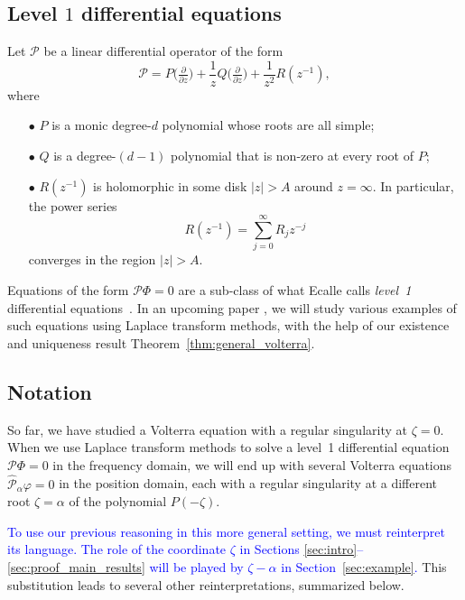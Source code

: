 \documentclass[review]{siamart220329}
\begin{document}
\subsection{Level $1$ differential equations}\label{sec:level 1 ODE}
Let $\mathcal{P}$ be a linear differential operator of the form
\[ \mathcal{P} = P\big(\tfrac{\partial}{\partial z}\big) + \frac{1}{z} Q\big(\tfrac{\partial}{\partial z}\big) + \frac{1}{z^2} R(z^{-1}), \]
where
\begin{enumerate}
\item[$\bullet$] $P$ is a monic degree-$d$ polynomial whose roots are all simple; 
\item[$\bullet$] $Q$ is a degree-$(d-1)$ polynomial that is non-zero at every root of $P$;
\item[$\bullet$] $R(z^{-1})$ is holomorphic in some disk $|z| > A$ around $z = \infty$. In particular, the power series
\[ R(z^{-1}) = \sum_{j=0}^\infty R_j z^{-j} \]
converges in the region $|z| > A$.
\end{enumerate}
Equations of the form $\mathcal{P}\Phi = 0$ are a sub-class of what Ecalle calls {\em level~1} differential equations~\cite[Section~2.1]{EcalleIII}\cite[Section~5.2.2.1]{diverg-resurg-iii}. In an upcoming paper \cite{borel_reg}, we will study various examples of such equations using Laplace transform methods, with the help of our existence and uniqueness result Theorem~\ref{thm:general_volterra}. 
\subsection{Notation}\label{sec:notation_alpha}
So far, we have studied a Volterra equation with a regular singularity at $\zeta = 0$. When we use Laplace transform methods to solve a level~1 differential equation $\mathcal{P}\Phi = 0$ in the frequency domain, we will end up with several Volterra equations $\hat{\mathcal{P}}_\alpha \varphi = 0$ in the position domain, each with a regular singularity at a different root $\zeta = \alpha$ of the polynomial $P(-\zeta)$.

\textcolor{blue}{To use our previous reasoning in this more general setting, we must reinterpret its language. The role of the coordinate $\zeta$ in Sections \ref{sec:intro}--\ref{sec:proof_main_results} will be played by $\zeta-\alpha$ in Section~\ref{sec:example}.} This substitution leads to several other reinterpretations, summarized below.
\end{document}
